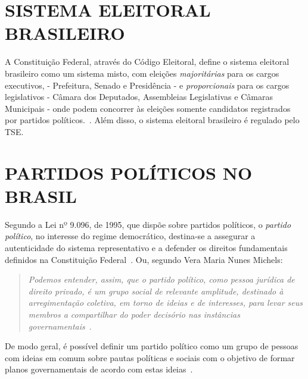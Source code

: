 
\section{\texorpdfstring{\MakeUppercase{Sistema Eleitoral Brasileiro}}{}}

A Constituição Federal, através do Código Eleitoral, define o sistema eleitoral brasileiro como um sistema misto, com eleições \emph{majoritárias} para os cargos executivos, - Prefeitura, Senado e Presidência - e \emph{proporcionais} para os cargos legislativos - Câmara dos Deputados, Assembleias Legislativas e Câmaras Municipais - onde podem concorrer às eleições somente candidatos registrados por partidos políticos.~\cite{brasil1965lei4737}. Além disso, o sistema eleitoral brasileiro é regulado pelo \gls{TSE}.

\section{\texorpdfstring{\MakeUppercase{Partidos Políticos no Brasil}}{}}
\label{conceitos__partidos-brasil}
    
Segundo a  Lei nº 9.096, de 1995, que dispõe sobre partidos políticos, o \emph{partido político}, no interesse do regime democrático, destina-se a assegurar a autenticidade do sistema representativo e a defender os direitos fundamentais definidos na Constituição Federal~\cite{brasil1995lei9096}. Ou, segundo Vera Maria Nunes Michels:

\begin{quotation}
    \emph{Podemos entender, assim, que o partido político, como pessoa jurídica de direito privado, é um grupo social de relevante amplitude, destinado à arregimentação coletiva, em torno de ideias e de interesses, para levar seus membros a compartilhar do poder decisório nas instâncias governamentais}~\cite{michels2006direito}.
\end{quotation}

De modo geral, é possível definir um partido político como um grupo de pessoas com ideias em comum sobre pautas políticas e sociais com o objetivo de formar planos governamentais de acordo com estas ideias~\cite{garibaldi2017partidos}.

